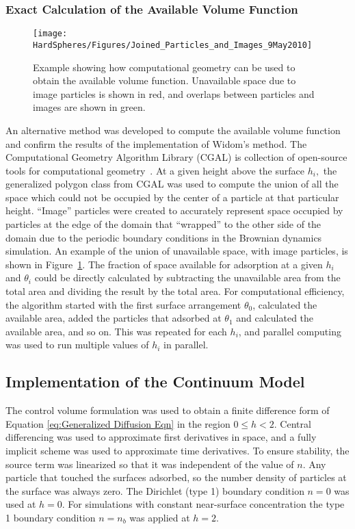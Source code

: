 \subsubsection{Exact Calculation of the Available Volume Function}

%
\begin{figure}
\texttt{[image: HardSpheres/Figures/Joined\_Particles\_and\_Images\_9May2010]}

\caption{\label{fig:Computational geometry}Example showing how computational
geometry can be used to obtain the available volume function. Unavailable
space due to image particles is shown in red, and overlaps between
particles and images are shown in green.}


%
\end{figure}
An alternative method was developed to compute the available volume
function and confirm the results of the implementation of Widom's
method. The Computational Geometry Algorithm Library (CGAL) is collection
of open-source tools for computational geometry~\cite{CGAL}. At
a given height above the surface $h_{i},$ the generalized polygon
class from CGAL was used to compute the union of all the space which\emph{
}could not be occupied by the center of a particle at that particular
height. {}``Image'' particles were created to accurately represent
space occupied by particles at the edge of the domain that {}``wrapped''
to the other side of the domain due to the periodic boundary conditions
in the Brownian dynamics simulation. An example of the union of unavailable
space, with image particles, is shown in Figure~\ref{fig:Computational geometry}.
The fraction of space available for adsorption at a given $h_{i}$
and $\theta_{i}$ could be directly calculated by subtracting the
unavailable area from the total area and dividing the result by the
total area. For computational efficiency, the algorithm started with
the first surface arrangement $\theta_{0}$, calculated the available
area, added the particles that adsorbed at $\theta_{1}$ and calculated
the available area, and so on. This was repeated for each $h_{i}$,
and parallel computing was used to run multiple values of $h_{i}$
in parallel.


\subsection{Implementation of the Continuum Model}

The control volume formulation \cite{Patankar1980} was used to obtain
a finite difference form of Equation \ref{eq:Generalized Diffusion Eqn}
in the region $0\leq h<2$. Central differencing was used to approximate
first derivatives in space, and a fully implicit scheme was used to
approximate time derivatives. To ensure stability, the source term
was linearized so that it was independent of the value of $n$. Any
particle that touched the surfaces adsorbed, so the number density
of particles at the surface was always zero. The Dirichlet (type 1)
boundary condition $n=0$ was used at $h=0$. For simulations with
constant near-surface concentration the type 1 boundary condition
$n=n_{b}$ was applied at $h=2$. 


